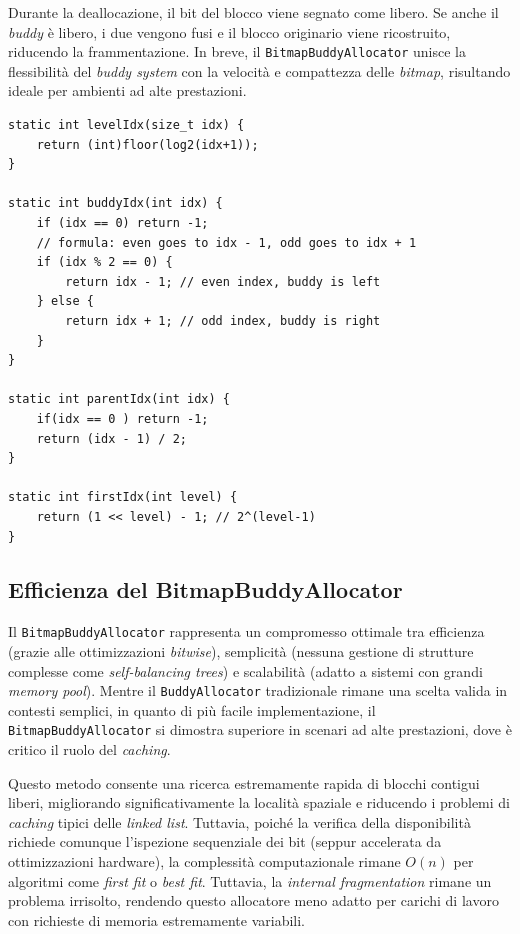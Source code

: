 Durante la deallocazione, il bit del blocco viene segnato come libero. Se anche il \textit{buddy} è libero, i due vengono fusi e il blocco originario viene ricostruito, riducendo la frammentazione. In breve, il \texttt{BitmapBuddyAllocator} unisce la flessibilità del \textit{buddy system} con la velocità e compattezza delle \textit{bitmap}, risultando ideale per ambienti ad alte prestazioni.

\begin{lstlisting}
static int levelIdx(size_t idx) {
    return (int)floor(log2(idx+1));
}

static int buddyIdx(int idx) {
    if (idx == 0) return -1;
    // formula: even goes to idx - 1, odd goes to idx + 1
    if (idx % 2 == 0) {
        return idx - 1; // even index, buddy is left
    } else {
        return idx + 1; // odd index, buddy is right
    }
}

static int parentIdx(int idx) {
    if(idx == 0 ) return -1;
    return (idx - 1) / 2;
}

static int firstIdx(int level) {
    return (1 << level) - 1; // 2^(level-1)
}
\end{lstlisting}

\subsection*{Efficienza del BitmapBuddyAllocator}
Il \texttt{BitmapBuddyAllocator} rappresenta un compromesso ottimale tra efficienza (grazie alle ottimizzazioni \textit{bitwise}), semplicità (nessuna gestione di strutture complesse come \textit{self-balancing trees}) e scalabilità (adatto a sistemi con grandi \textit{memory pool}). Mentre il \texttt{BuddyAllocator} tradizionale rimane una scelta valida in contesti semplici, in quanto di più facile implementazione, il \texttt{BitmapBuddyAllocator} si dimostra superiore in scenari ad alte prestazioni, dove è critico il ruolo del \textit{caching}. 

Questo metodo consente una ricerca estremamente rapida di blocchi contigui liberi, migliorando significativamente la località spaziale e riducendo i problemi di \textit{caching} tipici delle \textit{linked list}. Tuttavia, poiché la verifica della disponibilità richiede comunque l’ispezione sequenziale dei bit (seppur accelerata da ottimizzazioni hardware), la complessità computazionale rimane $O(n)$ per algoritmi come \textit{first fit} o \textit{best fit}. Tuttavia, la \textit{internal fragmentation} rimane un problema irrisolto, rendendo questo allocatore meno adatto per carichi di lavoro con richieste di memoria estremamente variabili.

